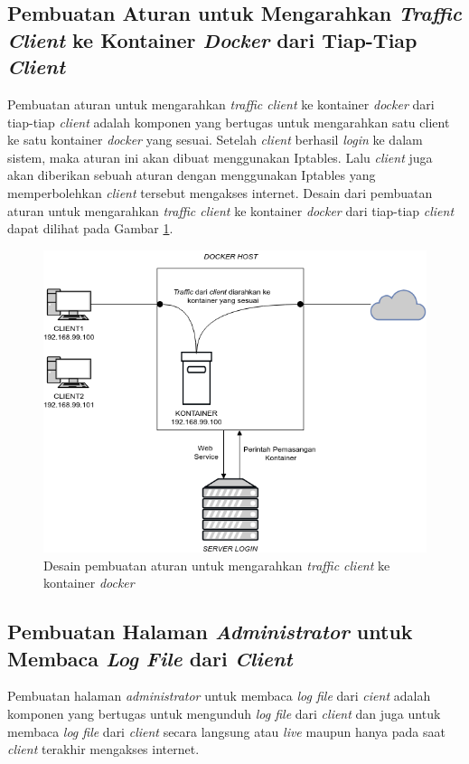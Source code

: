 \subsection{Pembuatan Aturan untuk Mengarahkan \textit{Traffic Client} ke Kontainer \textit{Docker} dari Tiap-Tiap \textit{Client}}
Pembuatan aturan untuk mengarahkan \textit{traffic client} ke kontainer \textit{docker} dari tiap-tiap \textit{client} adalah komponen yang bertugas untuk mengarahkan satu client ke satu kontainer \textit{docker} yang sesuai. Setelah \textit{client} berhasil \textit{login} ke dalam sistem, maka aturan ini akan dibuat menggunakan Iptables. Lalu \textit{client} juga akan diberikan sebuah aturan dengan menggunakan Iptables yang memperbolehkan \textit{client} tersebut mengakses internet. Desain dari pembuatan aturan untuk mengarahkan \textit{traffic client} ke kontainer \textit{docker} dari tiap-tiap \textit{client} dapat dilihat pada Gambar \ref{mengarahkankontainerdocker}.

\begin{figure}[H]
	\centering
	\includegraphics[width=\linewidth]{images/bab3/DIAGRAM3}
	\caption{Desain pembuatan aturan untuk mengarahkan \textit{traffic client} ke kontainer \textit{docker}}
	\label{mengarahkankontainerdocker}
\end{figure}

\subsection{Pembuatan Halaman \textit{Administrator} untuk Membaca \textit{Log File} dari \textit{Client}}
Pembuatan halaman \textit{administrator} untuk membaca \textit{log file} dari \textit{cient} adalah komponen yang bertugas untuk mengunduh \textit{log file} dari \textit{client} dan juga untuk membaca \textit{log file} dari \textit{client} secara langsung atau \textit{live} maupun hanya pada saat \textit{client} terakhir mengakses internet.


